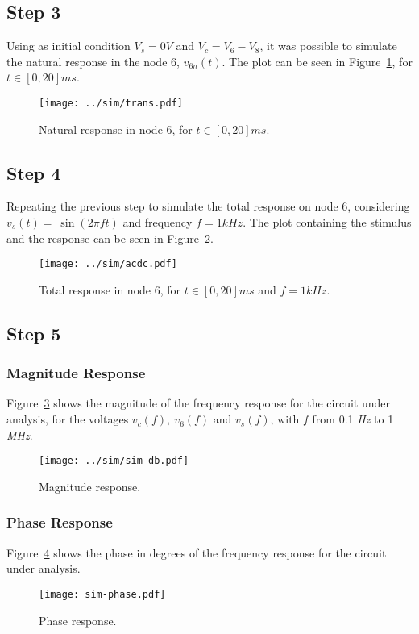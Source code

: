 \clearpage
\subsection{Step 3}

Using as initial condition $V_s=0V$ and $V_c = V_6-V_8$, it was possible to simulate the natural response in the node 6, $v_{6n}(t)$. The plot can be seen in Figure~\ref{fig:sim-v6n}, for $t\in [0,20]ms$.

\begin{figure}[ht!]
    \centering
    \texttt{[image: ../sim/trans.pdf]}
    \caption{Natural response in node 6, for $t\in [0,20]ms$.}
    \label{fig:sim-v6n}
\end{figure}
\FloatBarrier




\subsection{Step 4}
Repeating the previous step to simulate the total response on node 6, considering $v_s(t)=~\sin(2 \pi f t)$ and frequency $f=1 kHz$. The plot containing the stimulus and the response can be seen in Figure~\ref{fig:sim-v6total}.

\begin{figure}[ht!]
    \centering
    \texttt{[image: ../sim/acdc.pdf]}
    \caption{Total response in node 6, for $t\in [0,20]ms$ and $f=1 kHz$.}
    \label{fig:sim-v6total}
\end{figure}
\FloatBarrier



\subsection{Step 5}

\subsubsection{Magnitude Response}

Figure~\ref{fig:sim-db} shows the magnitude of the frequency response for the
circuit under analysis, for the voltages $v_c(f),\ v_6(f)$ and $v_s(f)$, with $f$ from 0.1 \textit{Hz} to 1 \textit{MHz}.

\begin{figure}[ht!] \centering
\texttt{[image: ../sim/sim-db.pdf]}
\caption{Magnitude response.}
\label{fig:sim-db}
\end{figure}
\FloatBarrier


\subsubsection{Phase Response}

Figure~\ref{fig:sim-phase} shows the phase in degrees of the frequency response for the
circuit under analysis.

\begin{figure}[ht!] \centering
\texttt{[image: sim-phase.pdf]}
\caption{Phase response.}
\label{fig:sim-phase}
\end{figure}
\FloatBarrier
